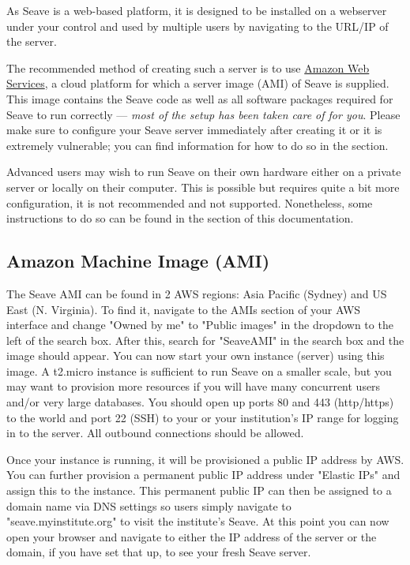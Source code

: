 \documentclass[11pt, a4paper]{article}
\begin{document}
As Seave is a web-based platform, it is designed to be installed on a webserver under your control and used by multiple users by navigating to the URL/IP of the server.

The recommended method of creating such a server is to use \href{https://aws.amazon.com}{Amazon Web Services}, a cloud platform for which a server image (AMI) of Seave is supplied. This image contains the Seave code as well as all software packages required for Seave to run correctly --- \textit{most of the setup has been taken care of for you}. Please make sure to configure your Seave server immediately after creating it or it is extremely vulnerable; you can find information for how to do so in the  section.

Advanced users may wish to run Seave on their own hardware either on a private server or locally on their computer. This is possible but requires quite a bit more configuration, it is not recommended and not supported. Nonetheless, some instructions to do so can be found in the  section of this documentation.


\subsection{Amazon Machine Image (AMI)}

The Seave AMI can be found in 2 AWS regions: Asia Pacific (Sydney) and US East (N. Virginia). To find it, navigate to the AMIs section of your AWS interface and change "Owned by me" to "Public images" in the dropdown to the left of the search box. After this, search for "SeaveAMI" in the search box and the image should appear. You can now start your own instance (server) using this image. A t2.micro instance is sufficient to run Seave on a smaller scale, but you may want to provision more resources if you will have many concurrent users and/or very large databases. You should open up ports 80 and 443 (http/https) to the world and port 22 (SSH) to your or your institution's IP range for logging in to the server. All outbound connections should be allowed.

Once your instance is running, it will be provisioned a public IP address by AWS. You can further provision a permanent public IP address under "Elastic IPs" and assign this to the instance. This permanent public IP can then be assigned to a domain name via DNS settings so users simply navigate to "seave.myinstitute.org" to visit the institute's Seave. At this point you can now open your browser and navigate to either the IP address of the server or the domain, if you have set that up, to see your fresh Seave server.
\end{document}

